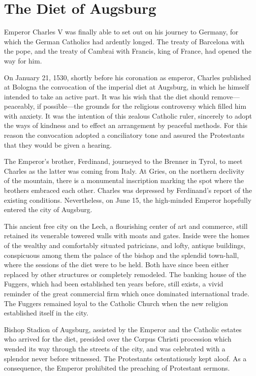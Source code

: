 \section{The Diet of Augsburg}

Emperor Charles V was finally able to set out on his journey to
Germany, for which the German Catholics had ardently longed. The
treaty of Barcelona with the pope, and the treaty of Cambrai with
Francis, king of France, had opened the way for him.

On January 21, 1530, shortly before his coronation as emperor,
Charles published at Bologna the convocation of the imperial diet at
Augsburg, in which he himself intended to take an active part. It was
his wish that the diet should remove—peaceably, if possible—the
grounds for the religious controversy which filled him with anxiety.
It was the intention of this zealous Catholic ruler, sincerely to adopt
the ways of kindness and to effect an arrangement by peaceful
methods. For this reason the convocation adopted a conciliatory tone
and assured the Protestants that they would be given a hearing.

The Emperor’s brother, Ferdinand, journeyed to the Brenner in
Tyrol, to meet Charles as the latter was coming from Italy. At Gries,
on the northern declivity of the mountain, there is a monumental
inscription marking the spot where the brothers embraced each other.
Charles was depressed by Ferdinand’s report of the existing conditions.
Nevertheless, on June 15, the high-minded Emperor hopefully entered
the city of Augsburg.

This ancient free city on the Lech, a flourishing center of art and
commerce, still retained its venerable towered walls with moats and
gates. Inside were the homes of the wealthy and comfortably situated
patricians, and lofty, antique buildings, conspicuous among them the
palace of the bishop and the splendid town-hall, where the sessions of
the diet were to be held. Both have since been either replaced by other
structures or completely remodeled. The banking house of the Fuggers,
which had been established ten years before, still exists, a vivid
reminder of the great commercial firm which once dominated international
trade. The Fuggers remained loyal to the Catholic Church
when the new religion established itself in the city.

Bishop Stadion of Augsburg, assisted by the Emperor and the
Catholic estates who arrived for the diet, presided over the Corpus
Christi procession which wended its way through the streets of the
city, and was celebrated with a splendor never before witnessed. The
Protestants ostentatiously kept aloof. As a consequence, the Emperor
prohibited the preaching of Protestant sermons.

